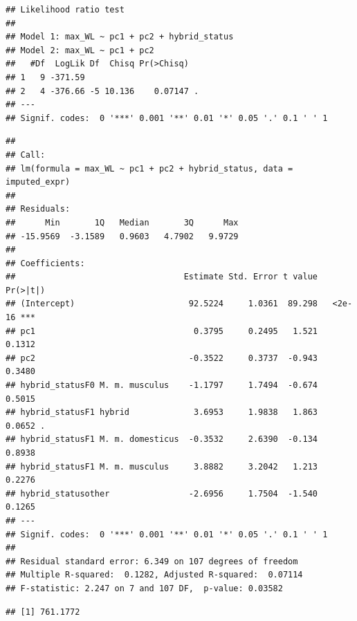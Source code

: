 \documentclass[
]{article}
\begin{document}
\begin{verbatim}
## Likelihood ratio test
## 
## Model 1: max_WL ~ pc1 + pc2 + hybrid_status
## Model 2: max_WL ~ pc1 + pc2
##   #Df  LogLik Df  Chisq Pr(>Chisq)  
## 1   9 -371.59                       
## 2   4 -376.66 -5 10.136    0.07147 .
## ---
## Signif. codes:  0 '***' 0.001 '**' 0.01 '*' 0.05 '.' 0.1 ' ' 1
\end{verbatim}

\begin{verbatim}
## 
## Call:
## lm(formula = max_WL ~ pc1 + pc2 + hybrid_status, data = imputed_expr)
## 
## Residuals:
##      Min       1Q   Median       3Q      Max 
## -15.9569  -3.1589   0.9603   4.7902   9.9729 
## 
## Coefficients:
##                                  Estimate Std. Error t value Pr(>|t|)    
## (Intercept)                       92.5224     1.0361  89.298   <2e-16 ***
## pc1                                0.3795     0.2495   1.521   0.1312    
## pc2                               -0.3522     0.3737  -0.943   0.3480    
## hybrid_statusF0 M. m. musculus    -1.1797     1.7494  -0.674   0.5015    
## hybrid_statusF1 hybrid             3.6953     1.9838   1.863   0.0652 .  
## hybrid_statusF1 M. m. domesticus  -0.3532     2.6390  -0.134   0.8938    
## hybrid_statusF1 M. m. musculus     3.8882     3.2042   1.213   0.2276    
## hybrid_statusother                -2.6956     1.7504  -1.540   0.1265    
## ---
## Signif. codes:  0 '***' 0.001 '**' 0.01 '*' 0.05 '.' 0.1 ' ' 1
## 
## Residual standard error: 6.349 on 107 degrees of freedom
## Multiple R-squared:  0.1282, Adjusted R-squared:  0.07114 
## F-statistic: 2.247 on 7 and 107 DF,  p-value: 0.03582
\end{verbatim}

\begin{verbatim}
## [1] 761.1772
\end{verbatim}
\end{document}
